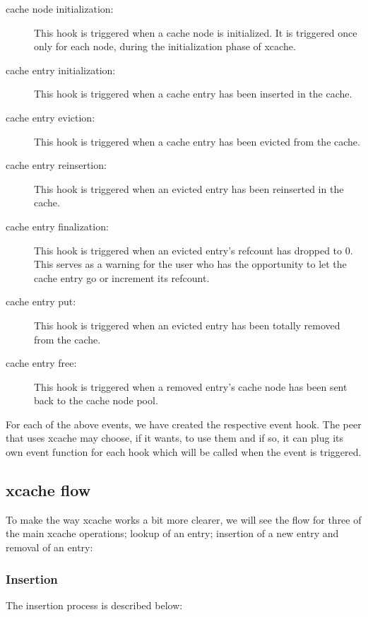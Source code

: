 \begin{description}
\item[cache node initialization:]
	This hook is triggered when a cache node is initialized. It is 
	triggered once only for each node, during the initialization phase of 
	xcache.
\item[cache entry initialization:]
	This hook is triggered when a cache entry has been inserted in the 
	cache.
\item[cache entry eviction:]
	This hook is triggered when a cache entry has been evicted from the 
	cache.
\item[cache entry reinsertion:]
	This hook is triggered when an evicted entry has been reinserted in the 
	cache.
\item[cache entry finalization:]
	This hook is triggered when an evicted entry's refcount has dropped to 
	0. This serves as a warning for the user who has the opportunity to let 
	the cache entry go or increment its refcount.
\item[cache entry put:]
	This hook is triggered when an evicted entry has been totally removed 
	from the cache.
\item[cache entry free:]
	This hook is triggered when a removed entry's cache node has been sent 
	back to the cache node pool.
\end{description}

For each of the above events, we have created the respective event hook. The 
peer that uses xcache may choose, if it wants, to use them and if so, it can 
plug its own event function for each hook which will be called when the event 
is triggered.

\subsection{xcache flow}\label{sec:xcache-flow-design}

To make the way xcache works a bit more clearer, we will see the flow for three 
of the main xcache operations; lookup of an entry; insertion of a new entry and 
removal of an entry:

\subsubsection{Insertion}

The insertion process is described below:

